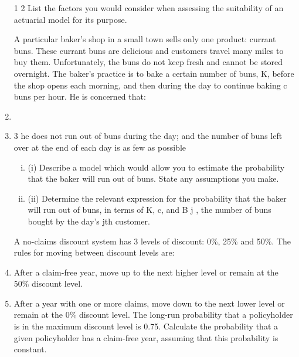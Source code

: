 \documentclass[a4paper,12pt]{article}
\begin{document}
\begin{enumerate}
1
2
List the factors you would consider when assessing the suitability of an actuarial
model for its purpose.

A particular baker’s shop in a small town sells only one product: currant buns. These
currant buns are delicious and customers travel many miles to buy them.
Unfortunately, the buns do not keep fresh and cannot be stored overnight.
The baker’s practice is to bake a certain number of buns, K, before the shop opens
each morning, and then during the day to continue baking c buns per hour. He is
concerned that:
\item
\item
3
he does not run out of buns during the day; and
the number of buns left over at the end of each day is as few as possible
\begin{enumerate}[(i)]
\item (i) Describe a model which would allow you to estimate the probability that the baker will run out of buns. State any assumptions you make.
\item 
(ii) Determine the relevant expression for the probability that the baker will run out of buns, in terms of K, c, and B j , the number of buns bought by the day’s jth customer.
\end{enumerate}

A no-claims discount system has 3 levels of discount: 0\%, 25\% and 50\%. The rules for moving between discount levels are:
\item After a claim-free year, move up to the next higher level or remain at the 50\% discount level.
\item After a year with one or more claims, move down to the next lower level or remain at the 0\% discount level.
The long-run probability that a policyholder is in the maximum discount level is 0.75. Calculate the probability that a given policyholder has a claim-free year, assuming that this probability is constant.




\end{enumerate}
\end{document}
